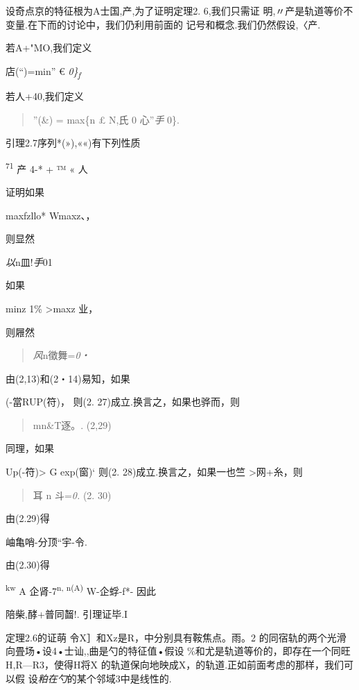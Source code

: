 \documentclass{article}
\begin{document}
设奇点京的特征根为A士国,产,为了证明定理2. 6,我们只需证
明,〃产是轨道等价不变量.在下而的讨论中，我们仍利用前面的
记号和概念.我们仍然假设,〈产.

若A+"MO,我们定义

店(``)=min'' € \emph{0\}\textsubscript{f}}

若人+40,我们定义

\begin{quote}
''(\&) = max\{n £ N,氏 0 心''\emph{手} 0\}.
\end{quote}

引理2.7序列*(»),««)有下列性质

\textsuperscript{71} 产 4-* + ™ « 人

证明如果

maxfzllo* Wmax\textbar{}z\textbar{}\textbar{}、，

则显然

\emph{以}n皿!\emph{手}01

如果

min\textbar{}z\textbar{} 1\% \textgreater{}max\textbar{}z\textbar{}
\textbar{}业，

则屜然

\begin{quote}
\emph{风}n徵舞=\emph{0・}
\end{quote}

由(2,13)和(2・14)易知，如果

(-當RUP(符)， 则(2. 27)成立.换言之，如果也骅而，则

\begin{quote}
mn\&T逐。. (2,29)
\end{quote}

同理，如果

Up(-符)\textgreater{} G exp(窗)` 则(2. 28)成立.换言之，如果一也竺
\textgreater{}网+糸，则

\begin{quote}
耳 n 斗=\emph{0.} (2. 30)
\end{quote}

由(2.29)得

岫亀哨-分顶``宇-令.

由(2.30)得

\textsuperscript{kw} A 企肾-7\textsuperscript{n, n(A)} W-企蜉-f*- 因此

陪柴\textbar{},酵+普同齧!. 引理证毕.I

定理2.6的证萌 令X］和Xz是R，中分别具有鞍焦点。雨。2
的同宿轨的两个光滑向畳场•设4•士讪,,曲是勺的特征值•假设
\%和尤是轨道等价的，即存在一个同旺H,R---R3，使得H将X\textbar{}
的轨道保向地映成X，的轨道.正如前面考虑的那样，我们可以假
设\emph{粕在勺}的某个邻域3中是线性的.
\end{document}

